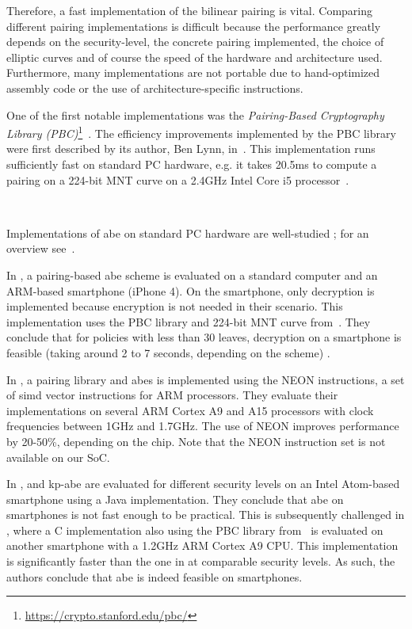 Therefore, a fast implementation of the bilinear pairing is vital.
Comparing different pairing implementations is difficult because the performance greatly depends on the \gls{security-level}, the concrete pairing implemented, the choice of elliptic curves and of course the speed of the hardware and architecture used. 
Furthermore, many implementations are not portable due to hand-optimized assembly code or the use of architecture-specific instructions.

One of the first notable implementations was the \emph{Pairing-Based Cryptography Library (PBC)}\footnote{\label{footnotepbc}\url{https://crypto.stanford.edu/pbc/}}~\cite{lynn_implementation_2007}. %
The efficiency improvements implemented by the PBC library were first described by its author, Ben Lynn, in~\cite{lynn_implementation_2007}.
This implementation runs sufficiently fast on standard PC hardware, e.g. it takes 20.5ms to compute a pairing on a 224-bit MNT curve on a 2.4GHz Intel Core i5 processor~\cite{akinyele_self-protecting_2010}.

~

Implementations of \acrshort{abe} on standard PC hardware are well-studied \cite{bethencourt_ciphertext-policy_2007,akinyele_charm_2013,green_functional_nodate}; for an overview see~\cite{zickau_applied_2016}.

In \cite{akinyele_self-protecting_2010}, a pairing-based \acrshort{abe} scheme is evaluated on a standard computer and an ARM-based smartphone (iPhone 4).
On the smartphone, only decryption is implemented because encryption is not needed in their scenario.
This implementation uses the PBC library and 224-bit MNT curve from~\cite{lynn_implementation_2007}.
They conclude that for policies with less than 30 leaves, decryption on a smartphone is feasible (taking around 2 to 7 seconds, depending on the scheme) \cite{akinyele_self-protecting_2010}.

In \cite{sanchez_neon_2013}, a pairing library and \acrshort{abes} is implemented using the NEON instructions, a set of \acrshort{simd} vector instructions for ARM processors.
They evaluate their implementations on several ARM Cortex A9 and A15 processors with clock frequencies between 1GHz and 1.7GHz.
The use of NEON improves performance by 20-50\%, depending on the chip.
Note that the NEON instruction set is not available on our SoC. %

In \cite{wang_performance_2014},  and \acrshort{kp-abe} are evaluated for different security levels on an Intel Atom-based smartphone using a Java implementation.
They conclude that \acrshort{abe} on smartphones is not fast enough to be practical.
This is subsequently challenged in \cite{ambrosin_feasibility_2015}, where a C implementation also using the PBC library from~\cite{lynn_implementation_2007} is evaluated on another smartphone with a 1.2GHz ARM Cortex A9 CPU.
This implementation is significantly faster than the one in \cite{wang_performance_2014} at comparable security levels.
As such, the authors conclude that \acrshort{abe} is indeed feasible on smartphones.

